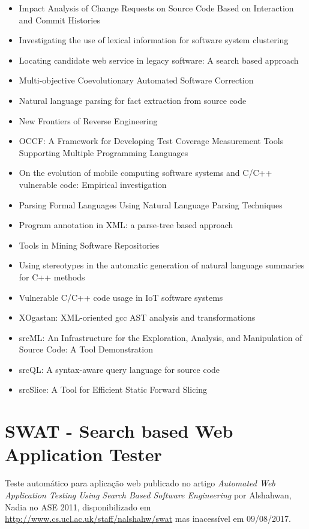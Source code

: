 \begin{itemize}
\item Impact Analysis of Change Requests on Source Code Based on Interaction and Commit Histories
\item Investigating the use of lexical information for software system clustering
\item Locating candidate web service in legacy software: A search based approach
\item Multi-objective Coevolutionary Automated Software Correction
\item Natural language parsing for fact extraction from source code
\item New Frontiers of Reverse Engineering
\item OCCF: A Framework for Developing Test Coverage Measurement Tools Supporting Multiple Programming Languages
\item On the evolution of mobile computing software systems and C/C++ vulnerable code: Empirical investigation
\item Parsing Formal Languages Using Natural Language Parsing Techniques
\item Program annotation in XML: a parse-tree based approach
\item Tools in Mining Software Repositories
\item Using stereotypes in the automatic generation of natural language summaries for C++ methods
\item Vulnerable C/C++ code usage in IoT software systems
\item XOgastan: XML-oriented gcc AST analysis and transformations
\item srcML: An Infrastructure for the Exploration, Analysis, and Manipulation of Source Code: A Tool Demonstration
\item srcQL: A syntax-aware query language for source code
\item srcSlice: A Tool for Efficient Static Forward Slicing
\end{itemize}


\section{SWAT - Search based Web Application Tester}

Teste automático para aplicação web
publicado no artigo {\it Automated Web Application Testing Using Search Based Software Engineering}
por Alshahwan, Nadia
no ASE 2011,
disponibilizado em \url{http://www.cs.ucl.ac.uk/staff/nalshahw/swat}
mas inacessível em 09/08/2017.

